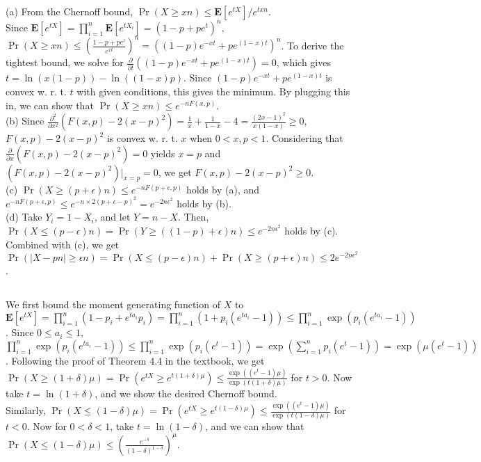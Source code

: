 \documentclass{article}
\begin{document}
\subsection{}
(a) From the Chernoff bound, $\Pr(X\geq xn) \leq \textbf{E}[e^{tX}]/e^{txn}$.\\
Since $\textbf{E}[e^{tX}]=\prod\limits_{i=1}^n\textbf{E}[e^{tX_i}]=(1-p+pe^t)^n$, $\Pr(X\geq xn) \leq \left( \frac{1-p+pe^t}{e^{xt}}\right)^n=((1-p)e^{-xt}+pe^{(1-x)t})^n$.
To derive the tightest bound, we solve for $\frac{\partial}{\partial t} ((1-p)e^{-xt}+pe^{(1-x)t})=0$, which gives $t=\ln(x(1-p))-\ln((1-x)p)$.
Since $(1-p)e^{-xt}+pe^{(1-x)t}$ is convex w. r. t. $t$ with given conditions, this gives the minimum.
By plugging this in, we can show that $\Pr(X\geq xn) \leq e^{-nF(x,p)}$.\\
(b) Since $\frac{\partial^2}{\partial x^2} (F(x,p)-2(x-p)^2)=\frac{1}{x}+\frac{1}{1-x}-4=\frac{(2x-1)^2}{x(1-x)}\geq 0$, $F(x,p)-2(x-p)^2$ is convex w. r. t. $x$ when $0<x,p<1$.
Considering that $\frac{\partial}{\partial x}(F(x,p)-2(x-p)^2)=0$ yields $x=p$ and $(F(x,p)-2(x-p)^2) \Big|_{x=p}=0$, we get $F(x,p)-2(x-p)^2 \geq 0$.\\
(c) $\Pr(X\geq(p+\epsilon)n)\leq e^{-nF(p+\epsilon,p)}$ holds by (a), and $e^{-nF(p+\epsilon,p)} \leq e^{-n\times 2(p+\epsilon-p)^2}=e^{-2n\epsilon^2}$ holds by (b).\\
(d) Take $Y_i=1-X_i$, and let $Y=n-X$. Then, $\Pr(X\leq (p-\epsilon)n)=\Pr(Y\geq((1-p)+\epsilon)n)\leq e^{-2n\epsilon^2}$ holds by (c).
Combined with (c), we get $\Pr(|X-pn|\geq \epsilon n)=\Pr(X\leq(p-\epsilon)n)+\Pr(X\geq(p+\epsilon)n)\leq 2e^{-2n\epsilon^2}$.
\subsection{}
We first bound the moment generating function of $X$ to $\textbf{E}[e^{tX}]=\prod\limits_{i=1}^n(1-p_i+e^{ta_i}p_i)=\prod\limits_{i=1}^n(1+p_i(e^{ta_i}-1))\leq\prod\limits_{i=1}^n\exp(p_i(e^{ta_i}-1))$.
Since $0 \leq a_i \leq 1$, $\prod\limits_{i=1}^n\exp(p_i(e^{ta_i}-1))\leq\prod\limits_{i=1}^n\exp(p_i(e^t-1))=\exp(\sum\limits_{i=1}^np_i(e^t-1))=\exp(\mu(e^t-1))$.
Following the proof of Theorem 4.4 in the textbook, we get $\Pr(X\geq (1+\delta)\mu)=\Pr(e^{tX}\geq e^{t(1+\delta)\mu})\leq \frac{\exp((e^t-1)\mu)}{\exp(t(1+\delta)\mu)}$ for $t>0$.
Now take $t=\ln(1+\delta)$, and we show the desired Chernoff bound.\\
Similarly, $\Pr(X\leq (1-\delta)\mu)=\Pr(e^{tX}\geq e^{t(1-\delta)\mu})\leq\frac{\exp((e^t-1)\mu)}{\exp(t(1-\delta)\mu)}$ for $t<0$.
Now for $0<\delta<1$, take $t=\ln(1-\delta)$, and we can show that $\Pr(X\leq (1-\delta)\mu)\leq\left(\frac{e^{-\delta}}{(1-\delta)^{1-\delta}}\right)^\mu$.
\end{document}
